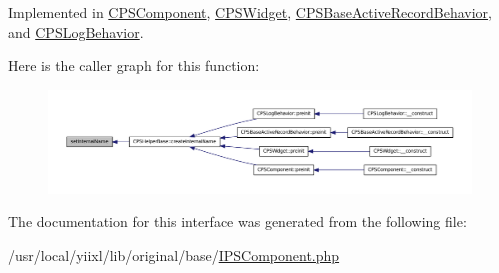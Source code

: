 Implemented in \hyperlink{classCPSComponent_a08e716b913e06fdbb77e84f81c0a3a35}{CPSComponent}, \hyperlink{classCPSWidget_a08e716b913e06fdbb77e84f81c0a3a35}{CPSWidget}, \hyperlink{classCPSBaseActiveRecordBehavior_a0c8c21c19fd1818f2f472ae1d81f086d}{CPSBaseActiveRecordBehavior}, and \hyperlink{classCPSLogBehavior_a0c8c21c19fd1818f2f472ae1d81f086d}{CPSLogBehavior}.



Here is the caller graph for this function:\nopagebreak
\begin{figure}[H]
\begin{center}
\leavevmode
\includegraphics[width=400pt]{interfaceIPSComponent_a08e716b913e06fdbb77e84f81c0a3a35_icgraph}
\end{center}
\end{figure}




The documentation for this interface was generated from the following file:\begin{DoxyCompactItemize}
\item 
/usr/local/yiixl/lib/original/base/\hyperlink{IPSComponent_8php}{IPSComponent.php}\end{DoxyCompactItemize}
